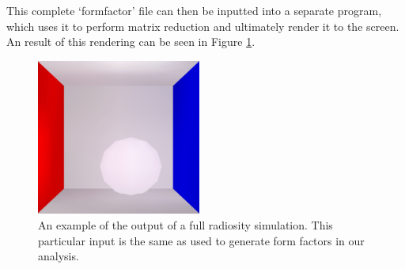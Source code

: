 \documentclass[conference]{IEEEtran}
\begin{document}
This complete `formfactor' file can then be inputted into a separate program, which uses it to perform matrix reduction and ultimately render it to the screen. An result of this rendering can be seen in Figure \ref{fig:radiosity}.
\begin{figure}
\includegraphics[width=0.48\textwidth]{radiosity.png}
\caption{An example of the output of a full radiosity simulation. This particular input is the same as used to generate form factors in our analysis.}
\label{fig:radiosity}
\end{figure}
\end{document}
